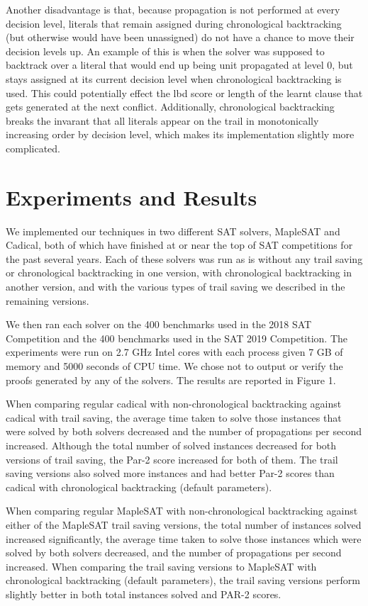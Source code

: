 \documentclass{article}
\begin{document}
Another disadvantage is that, because propagation is not performed at every decision level, literals that remain assigned during chronological backtracking (but otherwise would have been unassigned) do not have a chance to move their decision levels up. An example of this is when the solver was supposed to backtrack over a literal that would end up being unit propagated at level 0, but stays assigned at its current decision level when chronological backtracking is used. This could potentially effect the lbd score or length of the learnt clause that gets generated at the next conflict. Additionally, chronological backtracking breaks the invarant that all literals appear on the trail in monotonically increasing order by decision level, which makes its implementation slightly more complicated.

\section{Experiments and Results}
We implemented our techniques in two different SAT solvers, MapleSAT and Cadical, both of which have finished at or near the top of SAT competitions for the past several years. Each of these solvers was run as is without any trail saving or chronological backtracking in one version, with chronological backtracking in another version, and with the various types of trail saving we described in the remaining versions.

We then ran each solver on the 400 benchmarks used in the 2018 SAT Competition and the 400 benchmarks used in the SAT 2019 Competition. The experiments were run on 2.7 GHz Intel cores with each process given 7 GB of memory and 5000 seconds of CPU time. We chose not to output or verify the proofs generated by any of the solvers. The results are reported in Figure 1.

When comparing regular cadical with non-chronological backtracking against cadical with trail saving, the average time taken to solve those instances that were solved by both solvers decreased and the number of propagations per second increased. Although the total number of solved instances decreased for both versions of trail saving, the Par-2 score increased for both of them. The trail saving versions also solved more instances and had better Par-2 scores than cadical with chronological backtracking (default parameters).

When comparing regular MapleSAT with non-chronological backtracking against either of the MapleSAT trail saving versions, the total number of instances solved increased significantly, the average time taken to solve those instances which were solved by both solvers decreased, and the number of propagations per second increased. When comparing the trail saving versions to MapleSAT with chronological backtracking (default parameters), the trail saving versions perform slightly better in both total instances solved and PAR-2 scores.
\end{document}

